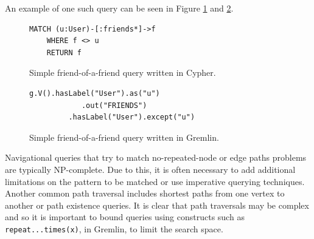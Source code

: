 An example of one such query can be seen in Figure \ref{lst:cypher-nav-1} and \ref{lst:gremlin-nav-1}.

\begin{figure}[h]
    \centering
    \begin{lstlisting}[language=cypher]
    MATCH (u:User)-[:friends*]->f
    WHERE f <> u
    RETURN f
    \end{lstlisting}
    \caption{Simple friend-of-a-friend query written in Cypher.}
    \label{lst:cypher-nav-1}
\end{figure}

\begin{figure}[h]
    \centering
    \begin{lstlisting}[language=gremlin]
    g.V().hasLabel("User").as("u")
            .out("FRIENDS")
         .hasLabel("User").except("u")
    \end{lstlisting}
    \caption{Simple friend-of-a-friend query written in Gremlin.}
    \label{lst:gremlin-nav-1}
\end{figure}

Navigational queries that try to match no-repeated-node or edge paths problems are typically NP-complete. Due to this, it is often necessary to add additional limitations on the pattern to be matched or use imperative querying techniques. Another common path traversal includes shortest paths from one vertex to another or path existence queries. It is clear that path traversals may be complex and so it is important to bound queries using constructs such as \texttt{repeat...times(x)}, in Gremlin, to limit the search space.
